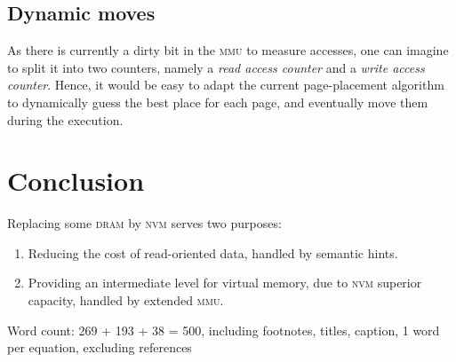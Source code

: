 \documentclass[twocolumn]{article}
\begin{document}
\subsection{Dynamic moves}
As there is currently a dirty bit in the \textsc{mmu} to measure accesses, one can imagine to split it into two counters, namely a \emph{read access counter} and a \emph{write access counter}. Hence, it would be easy to adapt the current page-placement algorithm to dynamically guess the best place for each page, and eventually move them during the execution.


\section{Conclusion}
Replacing some \textsc{dram} by \textsc{nvm} serves two purposes:
\begin{enumerate}
	\item Reducing the cost of read-oriented data, handled by semantic hints.
	\item Providing an intermediate level for virtual memory, due to \textsc{nvm} superior capacity, handled by extended \textsc{mmu}.
\end{enumerate}

{\color{gray} \noindent Word count: 269 + 193 + 38 = 500, including footnotes, titles, caption, 1 word per equation, excluding references}
\end{document}
